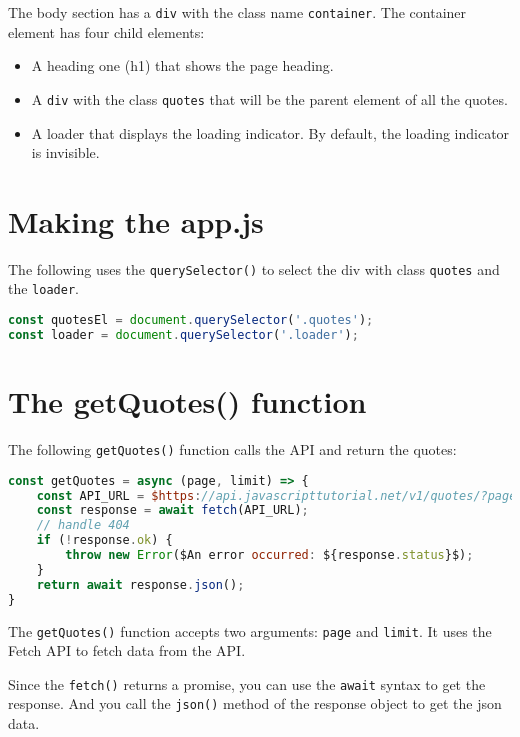 \documentclass[11pt]{article}
\begin{document}
\noindent
The body section has a \verb|div| with the class name \verb|container|.
The container element has four child elements:
\begin{itemize}
\item A heading one (h1) that shows the page heading.
\item A \verb|div| with the class \verb|quotes| that will be the parent element of
all the quotes.
\item A loader that displays the loading indicator. By default,
the loading indicator is invisible.
\end{itemize}
\section*{Making the app.js}

The following uses the \verb|querySelector()| to select the div with
class \verb|quotes| and the \verb|loader|.

\begin{lstlisting}[language=JavaScript]
const quotesEl = document.querySelector('.quotes');
const loader = document.querySelector('.loader');
\end{lstlisting}

\section*{The getQuotes() function}

The following \verb|getQuotes()| function calls the API and return the quotes:
\newpage
\begin{lstlisting}[language=JavaScript]
const getQuotes = async (page, limit) => {
    const API_URL = $https://api.javascripttutorial.net/v1/quotes/?page=${page}&limit=${limit}$;
    const response = await fetch(API_URL);
    // handle 404
    if (!response.ok) {
        throw new Error($An error occurred: ${response.status}$);
    }
    return await response.json();
}
\end{lstlisting}

\noindent
The \verb|getQuotes()| function accepts two arguments: \verb|page| and \verb|limit|.
It uses the Fetch API to fetch data from the API.
\newline

\noindent
Since the \verb|fetch()| returns a promise, you can use the \verb|await| syntax
to get the response. And you call the \verb|json()| method of the response
object to get the json data.
\newline
\end{document}

